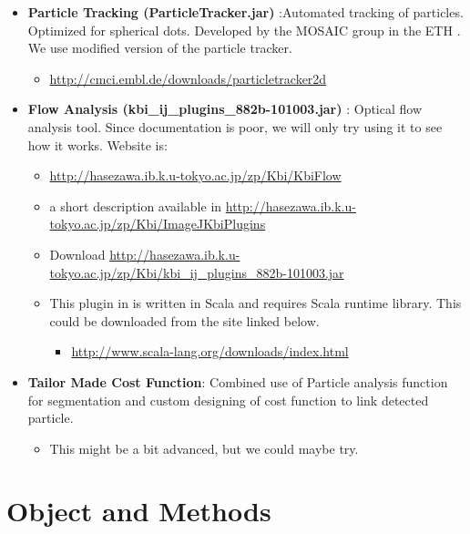 \documentclass[11pnt, twocolumn]{article}
\begin{document}
\begin{itemize}
\item \textbf{Particle Tracking (ParticleTracker.jar)} :Automated tracking of particles. Optimized for spherical dots. Developed by the MOSAIC group in the ETH \citep{Sbalzarini2005a, Sbalzarini2006a}.  We use modified version of the particle tracker. 
\begin{itemize}
\item \url{http://cmci.embl.de/downloads/particletracker2d}
\end{itemize}
\end{itemize}

\begin{itemize}
\item \textbf{Flow Analysis (kbi\_ij\_plugins\_882b-101003.jar) }: Optical flow analysis tool. Since documentation is poor, we will only try using it to see how it works. Website is: 
\begin{itemize}
\item \url{http://hasezawa.ib.k.u-tokyo.ac.jp/zp/Kbi/KbiFlow}
\item a short description available in \url{http://hasezawa.ib.k.u-tokyo.ac.jp/zp/Kbi/ImageJKbiPlugins}
\item Download \url{http://hasezawa.ib.k.u-tokyo.ac.jp/zp/Kbi/kbi\_ij\_plugins\_882b-101003.jar}
\item This plugin in is written in Scala and requires Scala runtime library. This could be downloaded from the site linked below. 
\begin{itemize}
\item \url{http://www.scala-lang.org/downloads/index.html}
\end{itemize}
\end{itemize}
\end{itemize}

\begin{itemize}
\item \textbf{Tailor Made Cost Function}: Combined use of Particle analysis function for segmentation and custom designing of cost function to link detected particle.
\begin{itemize}
\item This might be a bit advanced, but we could maybe try.  
\end{itemize}
\end{itemize}

\section{Object and Methods}
\end{document}
